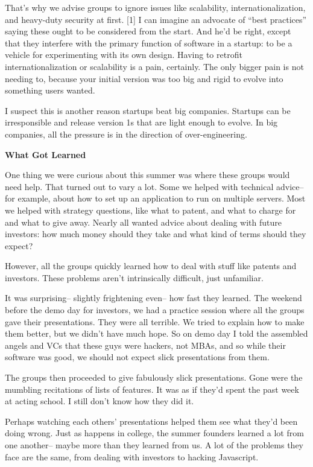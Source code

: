 That's why we advise groups to ignore issues like scalability,
internationalization, and heavy-duty security at first. {[}1{]} I can
imagine an advocate of ``best practices'' saying these ought to be
considered from the start. And he'd be right, except that they interfere
with the primary function of software in a startup: to be a vehicle for
experimenting with its own design. Having to retrofit
internationalization or scalability is a pain, certainly. The only
bigger pain is not needing to, because your initial version was too big
and rigid to evolve into something users wanted.

I suspect this is another reason startups beat big companies. Startups
can be irresponsible and release version 1s that are light enough to
evolve. In big companies, all the pressure is in the direction of
over-engineering.

\textbf{What Got Learned}

One thing we were curious about this summer was where these groups would
need help. That turned out to vary a lot. Some we helped with technical
advice-- for example, about how to set up an application to run on
multiple servers. Most we helped with strategy questions, like what to
patent, and what to charge for and what to give away. Nearly all wanted
advice about dealing with future investors: how much money should they
take and what kind of terms should they expect?

However, all the groups quickly learned how to deal with stuff like
patents and investors. These problems aren't intrinsically difficult,
just unfamiliar.

It was surprising-- slightly frightening even-- how fast they learned.
The weekend before the demo day for investors, we had a practice session
where all the groups gave their presentations. They were all terrible.
We tried to explain how to make them better, but we didn't have much
hope. So on demo day I told the assembled angels and VCs that these guys
were hackers, not MBAs, and so while their software was good, we should
not expect slick presentations from them.

The groups then proceeded to give fabulously slick presentations. Gone
were the mumbling recitations of lists of features. It was as if they'd
spent the past week at acting school. I still don't know how they did
it.

Perhaps watching each others' presentations helped them see what they'd
been doing wrong. Just as happens in college, the summer founders
learned a lot from one another-- maybe more than they learned from us. A
lot of the problems they face are the same, from dealing with investors
to hacking Javascript.

